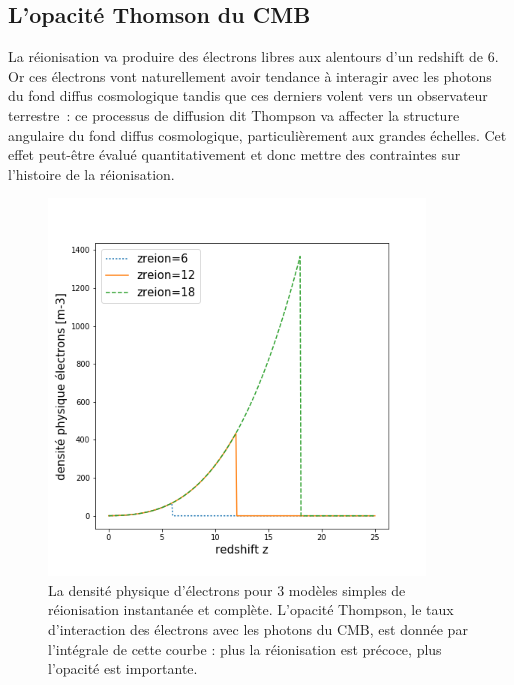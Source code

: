 \subsection{L'opacité Thomson du CMB}
La réionisation va produire des électrons libres aux alentours d'un redshift de 6. Or ces électrons vont naturellement avoir tendance à interagir avec les photons du fond diffus cosmologique tandis que ces derniers volent vers un observateur terrestre~: ce processus de diffusion dit Thompson va affecter la structure angulaire du fond diffus cosmologique, particulièrement aux grandes échelles. Cet effet peut-être évalué quantitativement et donc mettre des contraintes sur l'histoire de la réionisation.

\begin{figure}[htbp]
	\centering
		\includegraphics[height=10cm]{figs/ne.png}
		\caption[La densité d'électrons cosmique]{La densité physique d'électrons pour 3 modèles simples de réionisation instantanée et complète. L'opacité Thompson, le taux d'interaction des électrons avec les photons du CMB, est donnée par l'intégrale de cette courbe : plus la réionisation est précoce, plus l'opacité est importante.}
	\label{f:nereion}
\end{figure}

